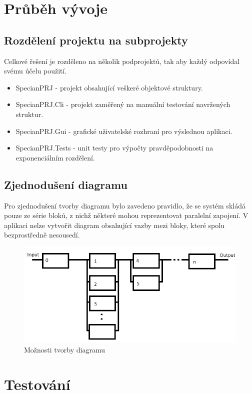 \documentclass[FM,RP]{tulthesis}
\begin{document}
\chapter{Průběh vývoje}
    \section{Rozdělení projektu na subprojekty}
        Celkové řešení je rozděleno na několik podprojektů, tak aby každý odpovídal svému účelu použití.
        \begin{itemize} 
        \item SpecianPRJ - projekt obsahující veškeré objektové struktury.
        \item SpecianPRJ.Cli - projekt zaměřený na manuální testování navržených struktur.
        \item SpecianPRJ.Gui - grafické uživatelské rozhraní pro výslednou aplikaci.
        \item SpecianPRJ.Tests - unit testy pro výpočty pravděpodobnosti na exponenciálním rozdělení.
        \end{itemize}
    \section{Zjednodušení diagramu}
        Pro zjednodušení tvorby diagramu bylo zavedeno pravidlo, že se systém skládá pouze ze série bloků, z nichž některé mohou reprezentovat paralelní zapojení.
        V aplikaci nelze vytvořit diagram obsahující vazby mezi bloky, které spolu bezprostředně nesousedí.
        \begin{figure}[h]
            \centering
            \includegraphics[scale=0.75]{pic/moznosti.png}
            \caption{Možnosti tvorby diagramu} \label{Obrázek č. 2.1}
    \end{figure}
\chapter{Testování}
\end{document}
